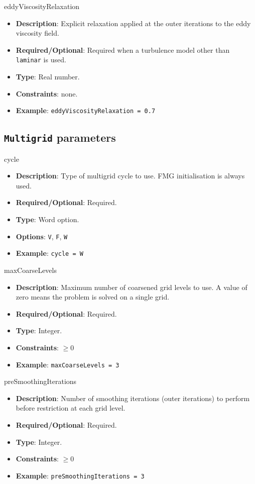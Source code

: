 eddyViscosityRelaxation
\vspace{\the\parameterListSpacing}
\begin{itemize}
    \item {\bf Description}: Explicit relaxation applied at the outer iterations to the eddy viscosity field.
    \item {\bf Required/Optional}: Required when a turbulence model other than \lstinline!laminar! is used.
    \item {\bf Type}: Real number.
    \item {\bf Constraints}: none.
    \item {\bf Example}: \lstinline!eddyViscosityRelaxation = 0.7!
\end{itemize}


\subsection*{ \lstinline!Multigrid! parameters }

cycle
\vspace{\the\parameterListSpacing}
\begin{itemize}
    \item {\bf Description}: Type of multigrid cycle to use. FMG initialisation is always used.
    \item {\bf Required/Optional}: Required.
    \item {\bf Type}: Word option.
    \item {\bf Options}: \lstinline!V!, \lstinline!F!, \lstinline!W!
    \item {\bf Example}: \lstinline!cycle = W!
\end{itemize}

maxCoarseLevels
\vspace{\the\parameterListSpacing}
\begin{itemize}
    \item {\bf Description}: Maximum number of coarsened grid levels to use. A value of zero means the problem is solved on a single grid. 
    \item {\bf Required/Optional}: Required.
    \item {\bf Type}: Integer.
    \item {\bf Constraints}: $\geq 0$
    \item {\bf Example}: \lstinline!maxCoarseLevels = 3!
\end{itemize}

preSmoothingIterations
\vspace{\the\parameterListSpacing}
\begin{itemize}
    \item {\bf Description}: Number of smoothing iterations (outer iterations) to perform before restriction at each grid level. 
    \item {\bf Required/Optional}: Required.
    \item {\bf Type}: Integer.
    \item {\bf Constraints}: $\geq 0$
    \item {\bf Example}: \lstinline!preSmoothingIterations = 3!
\end{itemize}

